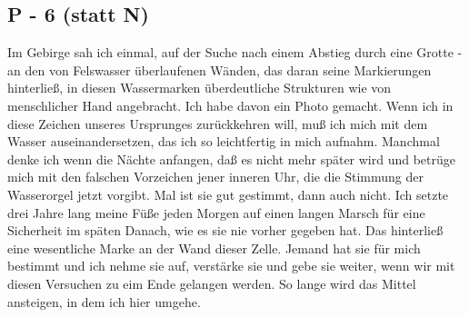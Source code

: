 \documentclass[
]{article}
\author{}
\date{\vspace{-2.5em}}
\begin{document}
\subsection{P - 6 (statt N)}\label{p---6-statt-n}

Im Gebirge sah ich einmal, auf der Suche nach einem Abstieg durch eine
Grotte - an den von Felswasser überlaufenen Wänden, das daran seine
Markierungen hinterließ, in diesen Wassermarken überdeutliche Strukturen
wie von menschlicher Hand angebracht. Ich habe davon ein Photo gemacht.
Wenn ich in diese Zeichen unseres Ursprunges zurückkehren will, muß ich
mich mit dem Wasser auseinandersetzen, das ich so leichtfertig in mich
aufnahm. Manchmal denke ich wenn die Nächte anfangen, daß es nicht mehr
später wird und betrüge mich mit den falschen Vorzeichen jener inneren
Uhr, die die Stimmung der Wasserorgel jetzt vorgibt. Mal ist sie gut
gestimmt, dann auch nicht. Ich setzte drei Jahre lang meine Füße jeden
Morgen auf einen langen Marsch für eine Sicherheit im späten Danach, wie
es sie nie vorher gegeben hat. Das hinterließ eine wesentliche Marke an
der Wand dieser Zelle. Jemand hat sie für mich bestimmt und ich nehme
sie auf, verstärke sie und gebe sie weiter, wenn wir mit diesen
Versuchen zu eim Ende gelangen werden. So lange wird das Mittel
ansteigen, in dem ich hier umgehe.
\end{document}
